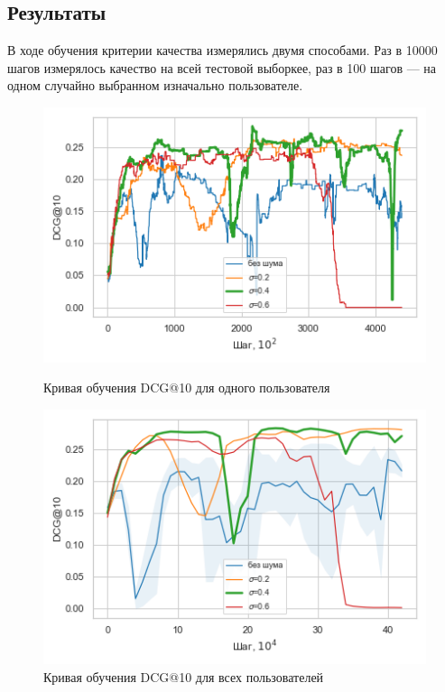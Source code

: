 \documentclass[14pt]{extarticle}
\begin{document}
\subsection{Результаты}

В ходе обучения критерии качества измерялись двумя способами. 
Раз в 10000 шагов измерялось качество на всей тестовой выборкее, раз в 100 шагов --- на одном случайно выбранном изначально пользователе.

\begin{figure}[H]
	\begin{minipage}[b]{0.49\textwidth}
		\centering
		\includegraphics[scale=0.55]{img/curve_dcg.png}
	\caption{Кривая обучения DCG@10 для одного пользователя}
	\label{fig:hit_curve}
	\end{minipage}
	\hfill
	\begin{minipage}[b]{0.49\textwidth}
		\centering
		\includegraphics[scale=0.55]{img/curve_dcg_all_.png}
	\caption{Кривая обучения DCG@10 для всех пользователей}
	\label{fig:hit_curve}
		
	\end{minipage}
\end{figure}
\end{document}
